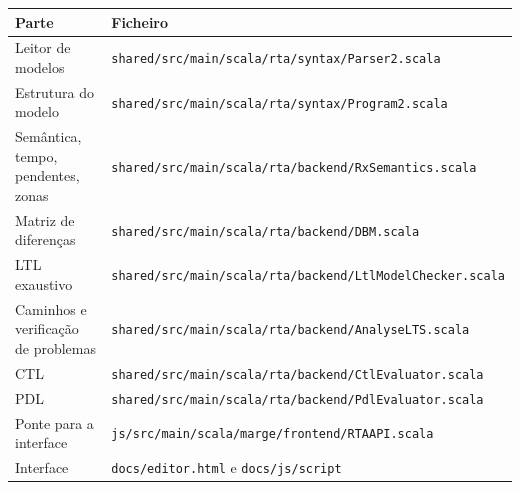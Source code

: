 \documentclass[11pt,a4paper]{article}
\begin{document}
\begin{center}
\begin{tabularx}{\textwidth}{lL}
\toprule
Parte & Ficheiro \\
\midrule
Leitor de modelos & \nolinkurl{shared/src/main/scala/rta/syntax/Parser2.scala} \\
Estrutura do modelo & \nolinkurl{shared/src/main/scala/rta/syntax/Program2.scala} \\
Semântica, tempo, pendentes, zonas & \nolinkurl{shared/src/main/scala/rta/backend/RxSemantics.scala} \\
Matriz de diferenças & \nolinkurl{shared/src/main/scala/rta/backend/DBM.scala} \\
LTL exaustivo & \nolinkurl{shared/src/main/scala/rta/backend/LtlModelChecker.scala} \\
Caminhos e verificação de problemas & \nolinkurl{shared/src/main/scala/rta/backend/AnalyseLTS.scala} \\
CTL & \nolinkurl{shared/src/main/scala/rta/backend/CtlEvaluator.scala} \\
PDL & \nolinkurl{shared/src/main/scala/rta/backend/PdlEvaluator.scala} \\
Ponte para a interface & \nolinkurl{js/src/main/scala/marge/frontend/RTAAPI.scala} \\
Interface & \nolinkurl{docs/editor.html} e \nolinkurl{docs/js/script} \\
\bottomrule
\end{tabularx}
\end{center}
\end{document}
